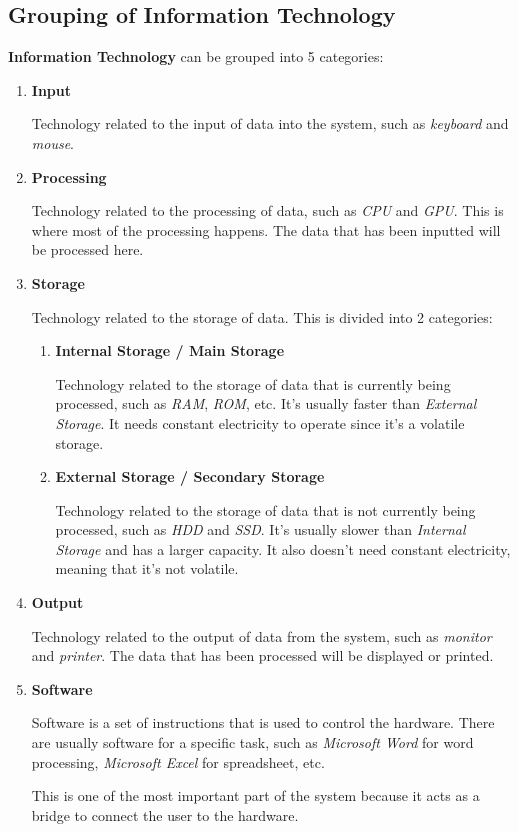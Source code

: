 \documentclass[12pt,titlepage]{article}
\begin{document}
\subsection{Grouping of Information Technology}
\textbf{Information Technology} can be grouped into 5 categories:
\begin{enumerate}
    \item {
        \textbf{Input}

        Technology related to the input of data into the system, such as \textit{keyboard} and \textit{mouse}.
    }
    \item {
        \textbf{Processing}

        Technology related to the processing of data, such as \textit{CPU} and \textit{GPU}. This is where most
        of the processing happens. The data that has been inputted will be processed here.
    }
    \item {
        \textbf{Storage}

        Technology related to the storage of data. This is divided into 2 categories:
        \begin{enumerate}
            \item {
                \textbf{Internal Storage / Main Storage}

                Technology related to the storage of data that is currently being processed, such as \textit{RAM}, \textit{ROM}, etc.
                It's usually faster than \textit{External Storage}. It needs constant electricity to operate since it's a
                volatile storage.
            }
            \item {
                \textbf{External Storage / Secondary Storage}

                Technology related to the storage of data that is not currently being processed, such as \textit{HDD} and \textit{SSD}.
                It's usually slower than \textit{Internal Storage} and has a larger capacity. It also doesn't need constant electricity,
                meaning that it's not volatile.
            }
        \end{enumerate}
    }
    \item {
        \textbf{Output}

        Technology related to the output of data from the system, such as \textit{monitor} and \textit{printer}.
        The data that has been processed will be displayed or printed.
    }
    \item {
        \textbf{Software}

        Software is a set of instructions that is used to control the hardware. There are usually
        software for a specific task, such as \textit{Microsoft Word} for word processing, \textit{Microsoft Excel}
        for spreadsheet, etc.

        This is one of the most important part of the system because it acts as a bridge to connect the user
        to the hardware.
    }
\end{enumerate}
\end{document}

